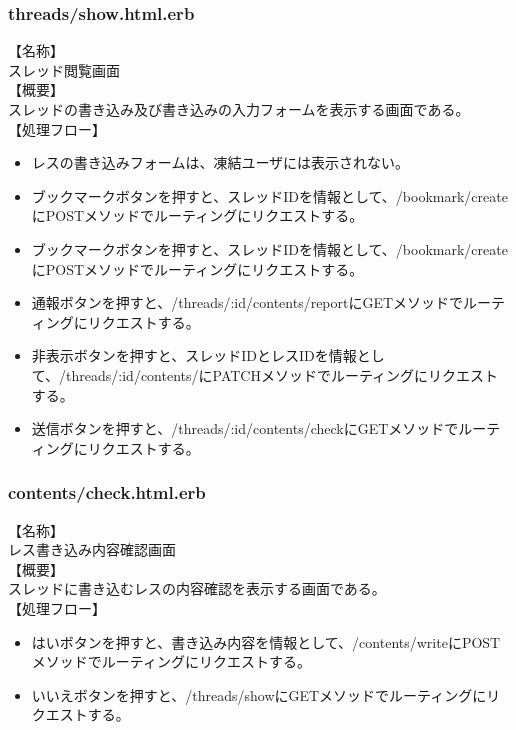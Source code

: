 \documentclass[a4j]{jarticle}
\begin{document}
\subsubsection{threads/show.html.erb}
\noindent
【名称】\\
スレッド閲覧画面\\
【概要】\\
スレッドの書き込み及び書き込みの入力フォームを表示する画面である。\\
【処理フロー】
\begin{itemize}
  \item レスの書き込みフォームは、凍結ユーザには表示されない。
  \item ブックマークボタンを押すと、スレッドIDを情報として、/bookmark/createにPOSTメソッドでルーティングにリクエストする。
  \item ブックマークボタンを押すと、スレッドIDを情報として、/bookmark/createにPOSTメソッドでルーティングにリクエストする。
  \item 通報ボタンを押すと、/threads/:id/contents/reportにGETメソッドでルーティングにリクエストする。
  \item 非表示ボタンを押すと、スレッドIDとレスIDを情報として、/threads/:id/contents/にPATCHメソッドでルーティングにリクエストする。
  \item 送信ボタンを押すと、/threads/:id/contents/checkにGETメソッドでルーティングにリクエストする。
\end{itemize}

\subsubsection{contents/check.html.erb}
\noindent
【名称】\\
レス書き込み内容確認画面\\
【概要】\\
スレッドに書き込むレスの内容確認を表示する画面である。\\
【処理フロー】
\begin{itemize}
  \item はいボタンを押すと、書き込み内容を情報として、/contents/writeにPOSTメソッドでルーティングにリクエストする。
  \item いいえボタンを押すと、/threads/showにGETメソッドでルーティングにリクエストする。
\end{itemize}
\end{document}

